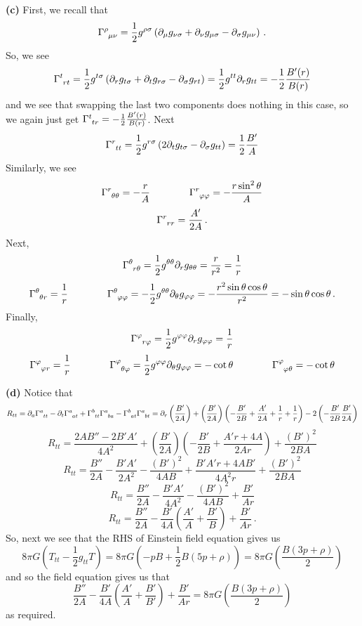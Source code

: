 \documentclass[10pt]{article}
\begin{document}
\textbf{(c)} First, we recall that
\[ \tensor{\Gamma}{^{\rho}_{\mu\nu}} = \frac{1}{2}g^{\rho \sigma}\left(\partial_{\mu}g_{\nu\sigma} + \partial_{\nu}g_{\mu\sigma} - \partial_{\sigma}g_{\mu\nu}\right) \, .\]
So, we see
\[ \tensor{\Gamma}{^{t}_{rt}} = \frac{1}{2}g^{t \sigma}\left(\partial_{r}g_{t\sigma} + \partial_{t}g_{r\sigma} - \partial_{\sigma}g_{rt}\right) = \frac{1}{2}g^{tt}\partial_{r}g_{tt} = -\frac{1}{2}\frac{B'(r)}{B(r)}\]
and we see that swapping the last two components does nothing in this case, so we again just get $\tensor{\Gamma}{^{t}_{tr}} = -\frac{1}{2}\frac{B'(r)}{B(r)}$. Next
\[ \tensor{\Gamma}{^{r}_{tt}} = \frac{1}{2}g^{r\sigma}\left(2\partial_{t}g_{t\sigma} - \partial_{\sigma}g_{tt}\right) = \frac{1}{2}\frac{B'}{A}\]
Similarly, we see
\[ \tensor{\Gamma}{^{r}_{\theta\theta}} = -\frac{r}{A} \hspace{4em} \tensor{\Gamma}{^{r}_{\varphi\varphi}} = -\frac{r\sin^{2}\theta}{A} \]
\[ \tensor{\Gamma}{^{r}_{rr}} = \frac{A'}{2A} \, .\]
Next,
\[ \tensor{\Gamma}{^{\theta}_{r\theta}} = \frac{1}{2}g^{\theta\theta}\partial_{r}g_{\theta\theta} = \frac{r}{r^{2}} = \frac{1}{r}\]
\[ \tensor{\Gamma}{^{\theta}_{\theta r}} = \frac{1}{r} \hspace{4em} \tensor{\Gamma}{^{\theta}_{\varphi\varphi}} = -\frac{1}{2}g^{\theta\theta}\partial_{\theta}g_{\varphi\varphi} = -\frac{r^{2}\sin\theta \cos\theta}{r^{2}} = -\sin\theta\cos\theta \, .\]
Finally,
\[ \tensor{\Gamma}{^{\varphi}_{r\varphi}}= \frac{1}{2}g^{\varphi\varphi}\partial_{r}g_{\varphi\varphi} = \frac{1}{r}\]
\[ \tensor{\Gamma}{^{\varphi}_{\varphi r}} = \frac{1}{r} \hspace{4em} \tensor{\Gamma}{^{\varphi}_{\theta\varphi}} = \frac{1}{2}g^{\varphi\varphi}\partial_{\theta}g_{\varphi\varphi} = -\cot \theta \hspace{4em} \tensor{\Gamma}{^{\varphi}_{\varphi\theta}} = -\cot \theta \]

\textbf{(d)} Notice that
\[ R_{tt} = \partial_{a}\tensor{\Gamma}{^{a}_{tt}} - \partial_{t}\tensor{\Gamma}{^{a}_{at}}  +\tensor{\Gamma}{^{b}_{tt}}\tensor{\Gamma}{^{a}_{ba}} - \tensor{\Gamma}{^{b}_{at}}\tensor{\Gamma}{^{a}_{bt}} = \partial_{r}\left(\frac{B'}{2A}\right) + \left(\frac{B'}{2A}\right)\left(-\frac{B'}{2B} + \frac{A'}{2A} + \frac{1}{r} + \frac{1}{r}\right) - 2\left(-\frac{B'}{2B}\frac{B'}{2A}\right) \]
\[R_{tt} = \frac{2AB'' - 2B'A'}{4A^{2}} + \left(\frac{B'}{2A}\right)\left(-\frac{B'}{2B} + \frac{A'r + 4A}{2Ar}\right) + \frac{(B')^{2}}{2BA} \]
\[R_{tt} = \frac{B''}{2A} -\frac{B'A'}{2A^{2}} - \frac{(B')^{2}}{4AB} + \frac{B'A'r + 4AB'}{4A^{2}r} + \frac{(B')^{2}}{2BA} \]
\[R_{tt} =\frac{B''}{2A} - \frac{B'A'}{4A^{2}}- \frac{(B')^{2}}{4AB} + \frac{B'}{Ar} \]
\[ R_{tt} = \frac{B''}{2A} - \frac{B'}{4A}\left(\frac{A'}{A} + \frac{B'}{B}\right) + \frac{B'}{Ar}\,. \]
So, next we see that the RHS of Einstein field equation gives us
\[ 8\pi G\left(T_{tt} - \frac{1}{2}g_{tt}T\right) = 8\pi G\left(-pB + \frac{1}{2}B(5p + \rho)\right) = 8\pi G\left(\frac{B(3p + \rho)}{2}\right) \]
and so the field equation gives us that
\[ \frac{B''}{2A} - \frac{B'}{4A}\left(\frac{A'}{A} + \frac{B'}{B'}\right) + \frac{B'}{Ar} = 8\pi G\left(\frac{B(3p + \rho)}{2}\right) \]
as required.
\end{document}
